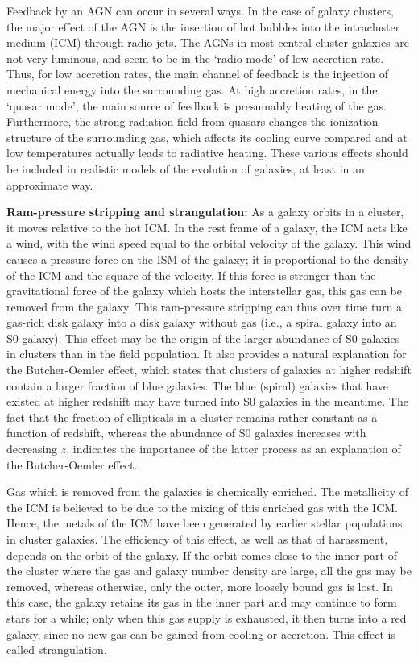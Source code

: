 \documentclass[a4paper,10pt]{article}
\begin{document}
{\noindent}Feedback by an AGN can occur in several ways. In the case of galaxy clusters, the major effect of the AGN is the insertion of hot bubbles into the intracluster medium (ICM) through radio jets. The AGNs in most central cluster galaxies are not very luminous, and seem to be in the `radio mode' of low accretion rate. Thus, for low accretion rates, the main channel of feedback is the injection of mechanical energy into the surrounding gas. At high accretion rates, in the `quasar mode', the main source of feedback is presumably heating of the gas. Furthermore, the strong radiation field from quasars changes the ionization structure of the surrounding gas, which affects its cooling curve compared and at low temperatures actually leads to radiative heating. These various effects should be included in realistic models of the evolution of galaxies, at least in an approximate way.

{\noindent}\textbf{Ram-pressure stripping and strangulation:} As a galaxy orbits in a cluster, it moves relative to the hot ICM. In the rest frame of a galaxy, the ICM acts like a wind, with the wind speed equal to the orbital velocity of the galaxy. This wind causes a pressure force on the ISM of the galaxy; it is proportional to the density of the ICM and the square of the velocity. If this force is stronger than the gravitational force of the galaxy which hosts the interstellar gas, this gas can be removed from the galaxy. This ram-pressure stripping can thus over time turn a gas-rich disk galaxy into a disk galaxy without gas (i.e., a spiral galaxy into an S0 galaxy). This effect may be the origin of the larger abundance of S0 galaxies in clusters than in the field population. It also provides a natural explanation for the Butcher-Oemler effect, which states that clusters of galaxies at higher redshift contain a larger fraction of blue galaxies. The blue (spiral) galaxies that have existed at higher redshift may have turned into S0 galaxies in the meantime. The fact that the fraction of ellipticals in a cluster remains rather constant as a function of redshift, whereas the abundance of S0 galaxies increases with decreasing $z$, indicates the importance of the latter process as an explanation of the Butcher-Oemler effect.

{\noindent}Gas which is removed from the galaxies is chemically enriched. The metallicity of the ICM is believed to be due to the mixing of this enriched gas with the ICM. Hence, the metals of the ICM have been generated by earlier stellar populations in cluster galaxies. The efficiency of this effect, as well as that of harassment, depends on the orbit of the galaxy. If the orbit comes close to the inner part of the cluster where the gas and galaxy number density are large, all the gas may be removed, whereas otherwise, only the outer, more loosely bound gas is lost. In this case, the galaxy retains its gas in the inner part and may continue to form stars for a while; only when this gas supply is exhausted, it then turns into a red galaxy, since no new gas can be gained from cooling or accretion. This effect is called strangulation.
\end{document}
